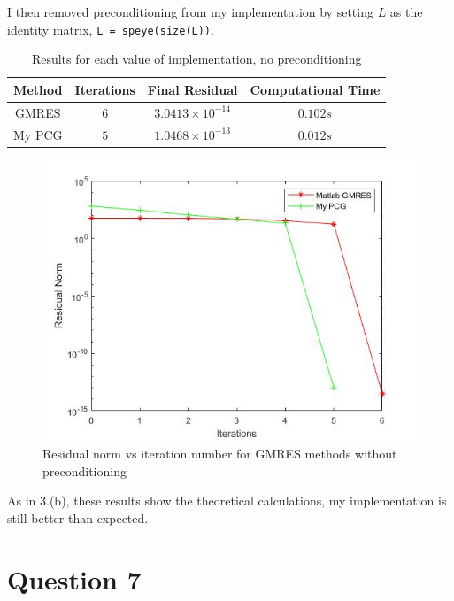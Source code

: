 \documentclass[a4paper, 11pt]{article}
\begin{document}
		
			I then removed preconditioning from my implementation by setting $L$ as the identity matrix, \texttt{L = speye(size(L))}.
				
			\begin{table}[H]
				\centering
				\begin{tabular}{c|c|c|c}
					\textbf{Method} &  \textbf{Iterations} 	& \textbf{Final Residual} 		& \textbf{Computational Time} 	\\ \hline
					GMRES			& 			$6$ 		& $ 3.0413 \times 10^{-14} $ 	& $ 0.102 s $	\\ \hline	
					My PCG 			& 			$5$			& $ 1.0468 \times 10^{-13} $	& $ 0.012 s $	\\
				\end{tabular}
				\caption{Results for each value of implementation, no preconditioning}
				\label{table:ex6_c_NoPrec}
			\end{table}
		
			\begin{figure}[H]
				\centering
				\includegraphics[width=.6\linewidth]{ex6b.jpg}
				\caption{Residual norm vs iteration number for GMRES methods without preconditioning}
				\label{fig:ex6_c_NoPrec}
			\end{figure}
		
			As in 3.(b), these results show the theoretical calculations, my implementation is still better than expected.				
		
		\section*{Question 7}
		
\end{document}
